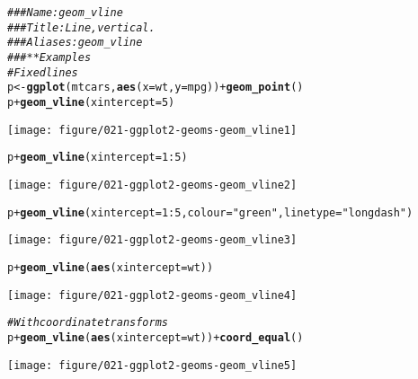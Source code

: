 \documentclass[a4paper,titlepage]{tufte-handout}\usepackage[]{graphicx}\usepackage[]{color}
\makeatletter
\def\maxwidth{ %
  \ifdim\Gin@nat@width>\linewidth
    \linewidth
  \else
    \Gin@nat@width
  \fi
}
\newcommand{\hlnum}[1]{\textcolor[rgb]{0.686,0.059,0.569}{#1}}%
\newcommand{\hlstr}[1]{\textcolor[rgb]{0.192,0.494,0.8}{#1}}%
\newcommand{\hlcom}[1]{\textcolor[rgb]{0.678,0.584,0.686}{\textit{#1}}}%
\newcommand{\hlopt}[1]{\textcolor[rgb]{0,0,0}{#1}}%
\newcommand{\hlstd}[1]{\textcolor[rgb]{0.345,0.345,0.345}{#1}}%
\newcommand{\hlkwb}[1]{\textcolor[rgb]{0.69,0.353,0.396}{#1}}%
\newcommand{\hlkwc}[1]{\textcolor[rgb]{0.333,0.667,0.333}{#1}}%
\newcommand{\hlkwd}[1]{\textcolor[rgb]{0.737,0.353,0.396}{\textbf{#1}}}%
\newenvironment{kframe}{%
 \def\at@end@of@kframe{}%
 \ifinner\ifhmode%
  \def\at@end@of@kframe{\end{minipage}}%
  \begin{minipage}{\columnwidth}%
 \fi\fi%
 \def\FrameCommand##1{\hskip\@totalleftmargin \hskip-\fboxsep
 \colorbox{shadecolor}{##1}\hskip-\fboxsep
     \hskip-\linewidth \hskip-\@totalleftmargin \hskip\columnwidth}%
 \MakeFramed {\advance\hsize-\width
   \@totalleftmargin\z@ \linewidth\hsize
   \@setminipage}}%
 {\par\unskip\endMakeFramed%
 \at@end@of@kframe}
\newenvironment{knitrout}{}{} %
\makeatother
\begin{document}
\begin{knitrout}
\color{fgcolor}\begin{kframe}
\begin{alltt}
\hlcom{### Name: geom_vline}
\hlcom{### Title: Line, vertical.}
\hlcom{### Aliases: geom_vline}
\hlcom{### ** Examples}
\hlcom{# Fixed lines}
\hlstd{p} \hlkwb{<-} \hlkwd{ggplot}\hlstd{(mtcars,} \hlkwd{aes}\hlstd{(}\hlkwc{x} \hlstd{= wt,} \hlkwc{y} \hlstd{= mpg))} \hlopt{+} \hlkwd{geom_point}\hlstd{()}
\hlstd{p} \hlopt{+} \hlkwd{geom_vline}\hlstd{(}\hlkwc{xintercept} \hlstd{=} \hlnum{5}\hlstd{)}
\end{alltt}
\end{kframe}
\texttt{[image: figure/021-ggplot2-geoms-geom\_vline1]} 
\begin{kframe}\begin{alltt}
\hlstd{p} \hlopt{+} \hlkwd{geom_vline}\hlstd{(}\hlkwc{xintercept} \hlstd{=} \hlnum{1}\hlopt{:}\hlnum{5}\hlstd{)}
\end{alltt}
\end{kframe}
\texttt{[image: figure/021-ggplot2-geoms-geom\_vline2]} 
\begin{kframe}\begin{alltt}
\hlstd{p} \hlopt{+} \hlkwd{geom_vline}\hlstd{(}\hlkwc{xintercept} \hlstd{=} \hlnum{1}\hlopt{:}\hlnum{5}\hlstd{,} \hlkwc{colour}\hlstd{=}\hlstr{"green"}\hlstd{,} \hlkwc{linetype} \hlstd{=} \hlstr{"longdash"}\hlstd{)}
\end{alltt}
\end{kframe}
\texttt{[image: figure/021-ggplot2-geoms-geom\_vline3]} 
\begin{kframe}\begin{alltt}
\hlstd{p} \hlopt{+} \hlkwd{geom_vline}\hlstd{(}\hlkwd{aes}\hlstd{(}\hlkwc{xintercept} \hlstd{= wt))}
\end{alltt}
\end{kframe}
\texttt{[image: figure/021-ggplot2-geoms-geom\_vline4]} 
\begin{kframe}\begin{alltt}
\hlcom{# With coordinate transforms}
\hlstd{p} \hlopt{+} \hlkwd{geom_vline}\hlstd{(}\hlkwd{aes}\hlstd{(}\hlkwc{xintercept} \hlstd{= wt))} \hlopt{+} \hlkwd{coord_equal}\hlstd{()}
\end{alltt}
\end{kframe}
\texttt{[image: figure/021-ggplot2-geoms-geom\_vline5]} 
\begin{kframe}\begin{alltt}

\end{alltt}
\end{kframe}
\end{knitrout}
\end{document}
